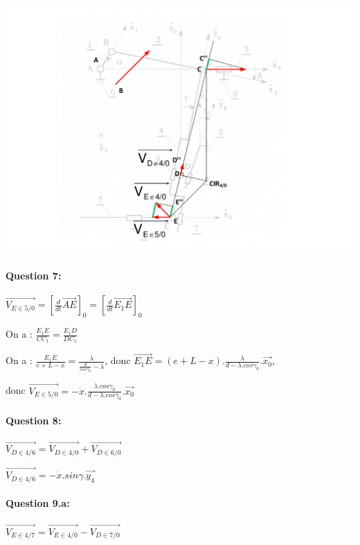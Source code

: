 \begin{center}
 \includegraphics[width=0.8\linewidth]{img/reglage_cor_cin_2}
\end{center}

\paragraph{Question 7:} 

$\overrightarrow{V_{E\in5/0}}=\left[\frac{d}{dt}\overrightarrow{AE}\right]_0=\left[\frac{d}{dt}\overrightarrow{E_1E}\right]_0$

On a : $\frac{E_1E}{CC_1}=\frac{E_1D}{DC_1}$

On a : $\frac{E_1E}{e+L-x}=\frac{\lambda}{\frac{d}{cos\gamma_0}-\lambda}$, donc $\overrightarrow{E_1E}=(e+L-x).\frac{\lambda}{d-\lambda.cos\gamma_0}.\overrightarrow{x_0}$,

donc $\overrightarrow{V_{E\in5/0}}=-\dot{x}.\frac{\lambda.cos\gamma_0}{d-\lambda.cos\gamma_0}.\overrightarrow{x_0}$

\paragraph{Question 8:}

$\overrightarrow{V_{D\in 4/6}}=\overrightarrow{V_{D\in 4/0}}+\overrightarrow{V_{D\in 6/0}}$

$\overrightarrow{V_{D\in 4/6}}=-\dot{x}.sin\gamma.\overrightarrow{y_4}$

\paragraph{Question 9.a:}

$\overrightarrow{V_{E\in 4/7}}=\overrightarrow{V_{E\in 4/0}}-\overrightarrow{V_{D\in 7/0}}$

